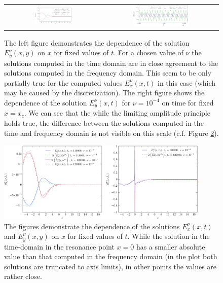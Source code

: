 \begin{figure}
\begin{tabular}{cc}
\includegraphics[width=0.4\textwidth]{pics_time_domain/res/ey_fixed_t_1e3-crop.pdf}&
\includegraphics[width=0.5\textwidth]{pics_time_domain/res/ey_fixed_x_nu1e4-crop.pdf}
\end{tabular}
\caption{The left figure demonstrates the dependence of the solution  
$E_y^{\nu}(x,y)$ on $x$ for fixed values of $t$. For a chosen value of $\nu$ the solutions computed in the time domain are in close agreement 
to the solutions computed in the frequency domain. This seem to be only partially 
true for the computed values $E_x^{\nu}(x,t)$ in this case (which may be caused by the discretization). 
The right figure shows the dependence of the solution $E_y^{\nu}(x,t)$ for $\nu=10^{-4}$ on time for fixed $x=x_c$. 
We can see that the while the limiting amplitude principle holds true, the difference between the solutions computed in 
the time and frequency domain is not visible on this scale (c.f. Figure \ref{fig:resonance_nus_eyx_t}). 
}
\label{fig:resonance_nus_ey_t}
\end{figure}

\begin{figure}
\includegraphics[width=0.9\textwidth]{pics_time_domain/res/ex_fixed_t_1e4_2-crop.pdf}
\caption{The figures demonstrate the dependence of the solutions 
$E_x^{\nu}(x,t)$ and $E_y^{\nu}(x,y)$ on $x$ for fixed values of $t$. While the solution in the time-domain 
in the resonance point $x=0$ has a smaller absolute value than that computed in the frequency domain (in the plot both solutions are truncated to 
axis limits), in other points the values are rather close. }
\label{fig:resonance_nus_eyx_t}
\end{figure}

